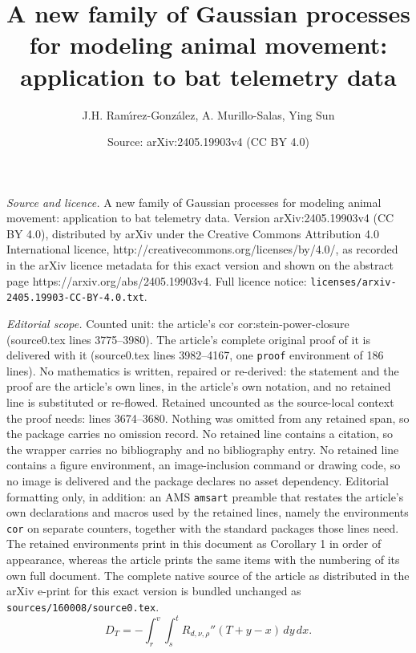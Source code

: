 \documentclass[10pt,a4paper]{amsart}
\title{A new family of Gaussian processes for modeling animal movement: application to bat telemetry data}
\author{J.H. Ram\'{\i}rez-Gonz\'{a}lez, A. Murillo-Salas, Ying Sun}
\date{Source: arXiv:2405.19903v4 (CC BY 4.0)}
\begin{document}
\maketitle

\noindent\emph{Source and licence.} A new family of Gaussian processes for modeling animal movement: application to bat telemetry data. Version arXiv:2405.19903v4 (CC BY 4.0), distributed by arXiv under the Creative Commons Attribution 4.0 International licence, http://creativecommons.org/licenses/by/4.0/, as recorded in the arXiv licence metadata for this exact version and shown on the abstract page https://arxiv.org/abs/2405.19903v4. Full licence notice: \texttt{licenses/arxiv-2405.19903-CC-BY-4.0.txt}.\par\smallskip

\noindent\textit{Editorial scope.} Counted unit: the article's cor cor:stein-power-closure (source0.tex lines 3775--3980). The article's complete original proof of it is delivered with it (source0.tex lines 3982--4167, one \texttt{proof} environment of 186 lines). No mathematics is written, repaired or re-derived: the statement and the proof are the article's own lines, in the article's own notation, and no retained line is substituted or re-flowed.  Retained uncounted as the source-local context the proof needs: lines 3674--3680.  Nothing was omitted from any retained span, so the package carries no omission record.  No retained line contains a citation, so the wrapper carries no bibliography and no bibliography entry.  No retained line contains a figure environment, an image-inclusion command or drawing code, so no image is delivered and the package declares no asset dependency.  Editorial formatting only, in addition: an AMS \texttt{amsart} preamble that restates the article's own declarations and macros used by the retained lines, namely the environments \texttt{cor} on separate counters, together with the standard packages those lines need.  The retained environments print in this document as Corollary 1 in order of appearance, whereas the article prints the same items with the numbering of its own full document.  The complete native source of the article as distributed in the arXiv e-print for this exact version is bundled unchanged as \texttt{sources/160008/source0.tex}.
\begin{equation}\label{eq:increment-double-integral}
D_T
=
-\int_r^v\int_s^t
R_{d,\nu,\rho}''(T+y-x)
\,dy\,dx.
\end{equation}
\end{document}
